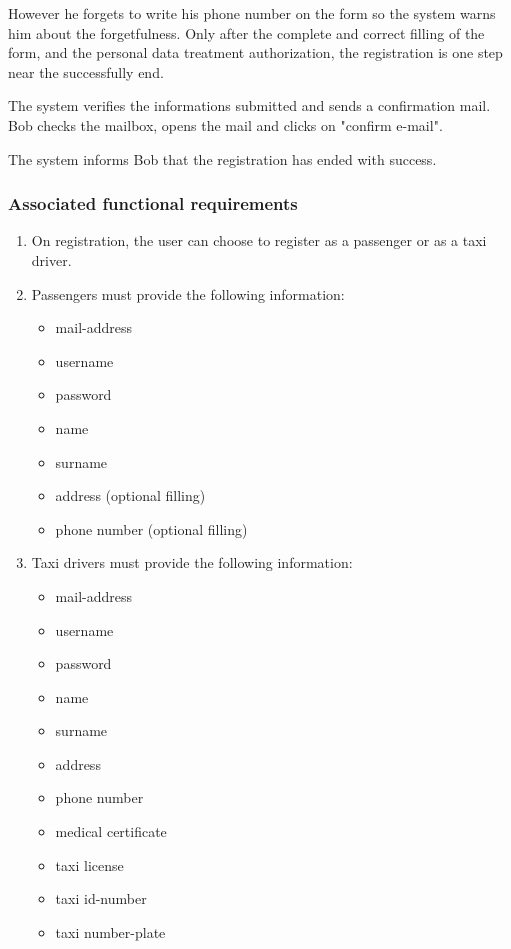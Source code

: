 However he forgets to write his phone number on the form so the system warns him about the forgetfulness.
Only after the complete and correct filling of the form, and the personal data treatment authorization, the registration is one step near the successfully end.

The system verifies the informations submitted and sends a confirmation mail.
Bob checks the mailbox, opens the mail and clicks on "confirm e-mail". 

The system informs Bob that the registration has ended with success.

\subsubsection{Associated functional requirements}

\begin{enumerate}
    \item On registration, the user can choose to register as a passenger or as a taxi driver.
    \item Passengers must provide the following information:
    \begin{itemize}
        \item mail-address
        \item username 
        \item password
        \item name
        \item surname
        \item address (optional filling)
        \item phone number (optional filling)
    \end{itemize}
    \item Taxi drivers must provide the following information:
    \begin{itemize}
        \item mail-address
        \item username 
        \item password
        \item name
        \item surname
        \item address 
        \item phone number
        \item medical certificate
        \item taxi license
        \item taxi id-number
        \item taxi number-plate

\end{itemize}
\end{enumerate}

